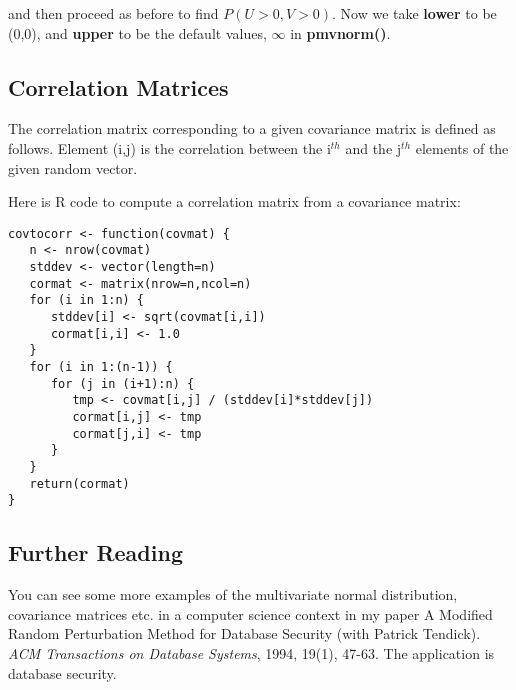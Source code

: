 and then proceed as before to find $P(U > 0, V > 0)$.  Now we take
{\bf lower} to be (0,0), and {\bf upper} to be the default values,
$\infty$ in {\bf pmvnorm()}.

\subsection{Correlation Matrices}

The correlation matrix corresponding to a given covariance matrix is
defined as follows.  Element (i,j) is the correlation between the
i$^{th}$ and the j$^{th}$ elements of the given random vector.

Here is R code to compute a correlation matrix from a covariance matrix:

\begin{lstlisting}
covtocorr <- function(covmat) {
   n <- nrow(covmat)
   stddev <- vector(length=n)
   cormat <- matrix(nrow=n,ncol=n)
   for (i in 1:n) {
      stddev[i] <- sqrt(covmat[i,i])
      cormat[i,i] <- 1.0
   }
   for (i in 1:(n-1)) {
      for (j in (i+1):n) {
         tmp <- covmat[i,j] / (stddev[i]*stddev[j])
         cormat[i,j] <- tmp
         cormat[j,i] <- tmp
      }
   }
   return(cormat)
}
\end{lstlisting}

\subsection{Further Reading}

You can see some more examples of the multivariate normal distribution,
covariance matrices etc. in a computer science context in my paper 
A Modified Random Perturbation Method for Database Security (with
Patrick Tendick). {\it ACM Transactions on Database Systems}, 1994, 19(1),
47-63.  The application is database security.

